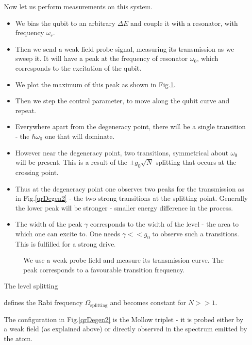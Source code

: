 Now let us perform measurements on this system.

\begin{itemize}
\item We bias the qubit to an arbitrary $ \Delta E $ and couple it with a resonator, with frequency $ \omega_r $.
\item Then we send a weak field probe signal, measuring its transmission as we sweep it. It will have a peak at the frequency of
  resonator $ \omega_0 $, which corresponds to the excitation of the qubit.
\item We plot the maximum of this peak as shown in Fig.\ref{qrProbe}.
\item Then we step the control parameter, to move along the qubit curve and repeat.
\item Everywhere apart from the degeneracy point, there will be a single transition - the $ \hbar\omega_0 $ one that will
  dominate.
\item However near the degeneracy point, two transitions, symmetrical about $ \omega_0 $ will be present. This is a result of the
  $ \pm g_0\sqrt{N} $ splitting that occurs at the crossing point.
\item Thus at the degeneracy point one observes two peaks for the transmission as in Fig.\ref{qrDegen2} - the two strong
  transitions at the splitting point. Generally the lower peak will be stronger - smaller energy difference in the process.
\item The width of the peak $ \gamma $ corresponds to the width of the level - the area to which one can excite to. One needs
  $ \gamma<<g_0 $ to observe such a transitions. This is fulfilled for a strong drive.
\end{itemize}

\begin{figure}
  \caption{We use a weak probe field and measure its transmission curve. The peak corresponds to a favourable transition
    frequency. \label{qrProbe}}
\end{figure}

{\LARGE The level splitting
	
	
  \noindent defines the Rabi frequency $ \Omega_\text{splitting} $ and becomes constant for $N>>1$.}

The configuration in Fig.\ref{qrDegen2} is the Mollow triplet - it is probed either by a weak field (as explained above) or
directly observed in the spectrum emitted by the atom.


